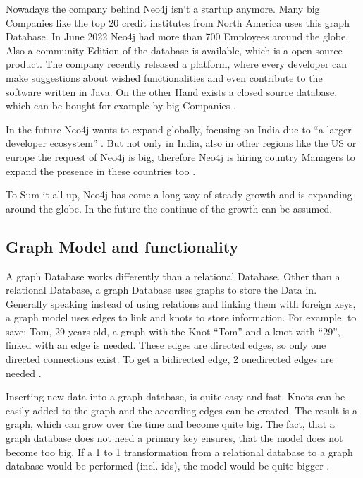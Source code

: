 Nowadays the company behind Neo4j isn`t a startup anymore. Many big Companies like the top 20 credit institutes from North America uses this graph Database.  In June 2022 Neo4j had more than 700 Employees around the globe.
Also a community Edition of the database is available, which is a open source product. The company recently released a platform, where every developer can make suggestions about wished functionalities and even contribute
to the software written in Java. On the other Hand exists a closed source database, which can be bought for example by big Companies \parencite{historyneo4j}.

In the future Neo4j wants to expand globally, focusing on India due to \enquote{a larger developer ecosystem} \parencite{historyneo4j}. But not only in India, also in other regions like the US or europe the request 
of Neo4j is big, therefore Neo4j is hiring country Managers to expand the presence in these countries too \parencite{historyneo4j}.

To Sum it all up, Neo4j has come a long way of steady growth and is expanding around the globe. In the future the continue of the growth can be assumed.

\subsection{Graph Model and functionality} \label{subsec:graphModelFunctionalityNeo4j}

A graph Database works differently than a relational Database. Other than a relational Database, a graph Database uses graphs to store the Data in. Generally speaking instead of using relations and linking them with foreign keys, a graph model uses edges to link and knots to store information.
For example, to save: Tom, 29 years old, a graph with the Knot \enquote{Tom} and a knot with \enquote{29}, linked with an edge is needed. These edges are directed edges, so only one directed connections exist. To get a bidirected edge, 2 onedirected edges are needed \parencite{graphmodelneo4j}.

Inserting new data into a graph database, is quite easy and fast. Knots can be easily added to the graph and the according edges can be created. The result is a graph, which can grow over the time and become quite big. The fact, that a graph database does not need a primary key ensures, that the model does not become too big. 
If a 1 to 1 transformation from a relational database to a graph database would be performed (incl. ids), the model would be quite bigger \parencite{graphmodelneo4j}.

